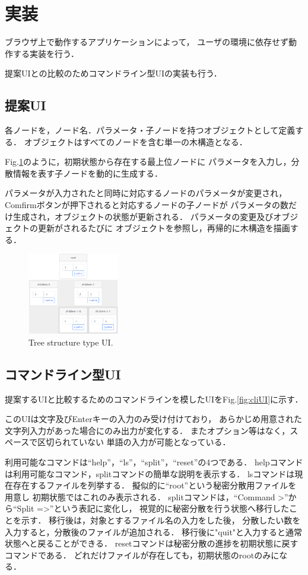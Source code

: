 \documentclass[fleqn, uplatex]{jsarticle}
\begin{document}
\section{実装}
ブラウザ上で動作するアプリケーションによって，%
ユーザの環境に依存せず動作する実装を行う．

提案UIとの比較のためコマンドライン型UIの実装も行う．

\subsection{提案UI}
各ノードを，ノード名．パラメータ・子ノードを持つオブジェクトとして定義する．
オブジェクトはすべてのノードを含む単一の木構造となる．

Fig.\ref{fig:treeUI}のように，初期状態から存在する最上位ノードに%
パラメータを入力し，分散情報を表す子ノードを動的に生成する．

パラメータが入力されたと同時に対応するノードのパラメータが変更され，%
Comfirmボタンが押下されると対応するノードの子ノードが%
パラメータの数だけ生成され，オブジェクトの状態が更新される．%
パラメータの変更及びオブジェクトの更新がされるたびに%
オブジェクトを参照し，再帰的に木構造を描画する．

\hspace{3mm}

\begin{figure}[htbp]
	\centering
	\includegraphics[width=40mm]{treeUI.png}
		\caption{Tree structure type UI.}
		\label{fig:treeUI}
\end{figure}

\subsection{コマンドライン型UI}
提案するUIと比較するためのコマンドラインを模したUIをFig.\ref{fig:cliUI}に示す．

このUIは文字及びEnterキーの入力のみ受け付けており，%
あらかじめ用意された文字列入力があった場合にのみ出力が変化する．%
またオプション等はなく，スペースで区切られていない%
単語の入力が可能となっている．

利用可能なコマンドは``help''，``ls''，``split''，``reset''の4つである．%
helpコマンドは利用可能なコマンド，splitコマンドの簡単な説明を表示する．%
lsコマンドは現在存在するファイルを列挙する．%
擬似的に``root''という秘密分散用ファイルを用意し%
初期状態ではこれのみ表示される．%
splitコマンドは，``Command >''から``Split =>''という表記に変化し，%
視覚的に秘密分散を行う状態へ移行したことを示す．%
移行後は，対象とするファイル名の入力をした後，%
分散したい数を入力すると，分散後のファイルが追加される．%
移行後に"quit"と入力すると通常状態へと戻ることができる．%
resetコマンドは秘密分散の進捗を初期状態に戻すコマンドである．%
どれだけファイルが存在しても，初期状態のrootのみになる．
\end{document}
